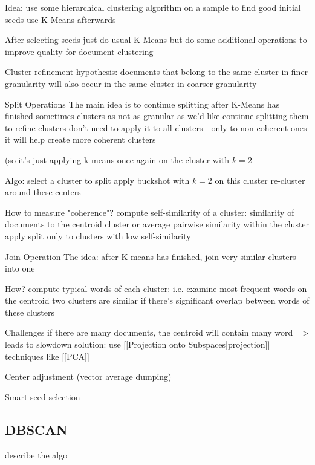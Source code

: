 Idea:
use some hierarchical clustering algorithm on a sample to find good initial seeds
use K-Means afterwards

After selecting seeds just do usual K-Means
but do some additional operations to improve quality for document clustering


Cluster refinement hypothesis:
documents that belong to the same cluster in finer granularity will also occur in the same cluster in coarser granularity


Split Operations
The main idea is to continue splitting after K-Means has finished
sometimes clusters as not as granular as we'd like
continue splitting them to refine clusters
don't need to apply it to all clusters - only to non-coherent ones
it will help create more coherent clusters

(so it's just applying k-means once again on the cluster with $k=2$

Algo:
select a cluster to split
apply buckshot with $k=2$ on this cluster
re-cluster around these centers


How to measure "coherence"?
compute self-similarity of a cluster:
similarity of documents to the centroid cluster
or average pairwise similarity within the cluster
apply split only to clusters with low self-similarity


Join Operation
The idea:
after K-means has finished,
join very similar clusters into one


How?
compute typical words of each cluster:
i.e. examine most frequent words on the centroid
two clusters are similar if there's significant overlap between words of these clusters



Challenges
if there are many documents, the centroid will contain many word => leads to slowdown
solution: use [[Projection onto Subspaces|projection]] techniques like [[PCA]] 





Center adjustment (vector average dumping) \cite{larsen1999fast}

Smart seed selection \cite{cutting1992scatter} \cite{larsen1999fast}



\subsection{DBSCAN} \label{sec:dbscan}

describe the algo \cite{ester1996density}

